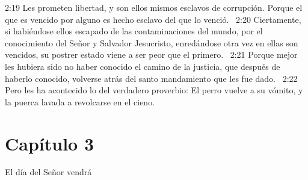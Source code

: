 2:19 Les prometen libertad, y son ellos mismos esclavos de corrupción. Porque el que es vencido por alguno es hecho esclavo del que lo venció.  
2:20 Ciertamente, si habiéndose ellos escapado de las contaminaciones del mundo, por el conocimiento del Señor y Salvador Jesucristo, enredándose otra vez en ellas son vencidos, su postrer estado viene a ser peor que el primero.  
2:21 Porque mejor les hubiera sido no haber conocido el camino de la justicia, que después de haberlo conocido, volverse atrás del santo mandamiento que les fue dado.  
2:22 Pero les ha acontecido lo del verdadero proverbio: El perro vuelve a su vómito, y la puerca lavada a revolcarse en el cieno.  
\section*{Capítulo 3 }
El día del Señor vendrá  

